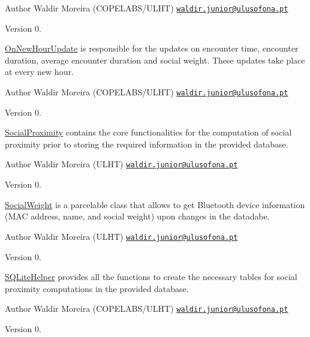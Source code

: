 \begin{DoxyAuthor}{Author}
Waldir Moreira (C\+O\+P\+E\+L\+A\+B\+S/\+U\+L\+H\+T) \href{mailto:waldir.junior@ulusofona.pt}{\tt waldir.\+junior@ulusofona.\+pt}
\end{DoxyAuthor}
\begin{DoxyVersion}{Version}
0.
\end{DoxyVersion}
\hyperlink{classcom_1_1social_1_1proximity_1_1_on_new_hour_update}{On\+New\+Hour\+Update} is responsible for the updates on encounter time, encounter duration, average encounter duration and social weight. These updates take place at every new hour.

\begin{DoxyAuthor}{Author}
Waldir Moreira (C\+O\+P\+E\+L\+A\+B\+S/\+U\+L\+H\+T) \href{mailto:waldir.junior@ulusofona.pt}{\tt waldir.\+junior@ulusofona.\+pt}
\end{DoxyAuthor}
\begin{DoxyVersion}{Version}
0.
\end{DoxyVersion}
\hyperlink{classcom_1_1social_1_1proximity_1_1_social_proximity}{Social\+Proximity} contains the core functionalities for the computation of social proximity prior to storing the required information in the provided database.

\begin{DoxyAuthor}{Author}
Waldir Moreira (U\+L\+H\+T) \href{mailto:waldir.junior@ulusofona.pt}{\tt waldir.\+junior@ulusofona.\+pt}
\end{DoxyAuthor}
\begin{DoxyVersion}{Version}
0.
\end{DoxyVersion}
\hyperlink{classcom_1_1social_1_1proximity_1_1_social_weight}{Social\+Weight} is a parcelable class that allows to get Bluetooth device information (M\+A\+C address, name, and social weight) upon changes in the datadabe.

\begin{DoxyAuthor}{Author}
Waldir Moreira (U\+L\+H\+T) \href{mailto:waldir.junior@ulusofona.pt}{\tt waldir.\+junior@ulusofona.\+pt}
\end{DoxyAuthor}
\begin{DoxyVersion}{Version}
0.
\end{DoxyVersion}
\hyperlink{classcom_1_1social_1_1proximity_1_1_s_q_lite_helper}{S\+Q\+Lite\+Helper} provides all the functions to create the necessary tables for social proximity computations in the provided database.

\begin{DoxyAuthor}{Author}
Waldir Moreira (C\+O\+P\+E\+L\+A\+B\+S/\+U\+L\+H\+T) \href{mailto:waldir.junior@ulusofona.pt}{\tt waldir.\+junior@ulusofona.\+pt}
\end{DoxyAuthor}
\begin{DoxyVersion}{Version}
0. 
\end{DoxyVersion}
